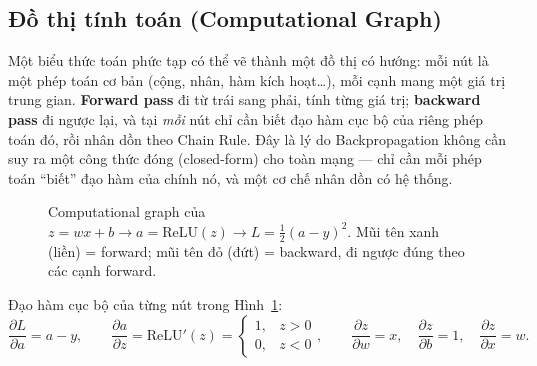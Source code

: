 \documentclass[12pt,a4paper]{article}
\begin{document}
\subsection{Đồ thị tính toán (Computational Graph)}
\label{sec:compgraph}

Một biểu thức toán phức tạp có thể vẽ thành một đồ thị có hướng: mỗi nút là
một phép toán cơ bản (cộng, nhân, hàm kích hoạt\ldots), mỗi cạnh mang một
giá trị trung gian. \textbf{Forward pass} đi từ trái sang phải, tính từng
giá trị; \textbf{backward pass} đi ngược lại, và tại \emph{mỗi} nút chỉ cần
biết đạo hàm cục bộ của riêng phép toán đó, rồi nhân dồn theo Chain Rule.
Đây là lý do Backpropagation không cần suy ra một công thức đóng
(closed-form) cho toàn mạng --- chỉ cần mỗi phép toán ``biết'' đạo hàm của
chính nó, và một cơ chế nhân dồn có hệ thống.

\begin{figure}[htbp]
\centering
{}
\caption{Computational graph của $z=wx+b \to a=\mathrm{ReLU}(z) \to L=\tfrac12(a-y)^2$.
Mũi tên xanh (liền) = forward; mũi tên đỏ (đứt) = backward, đi ngược đúng
theo các cạnh forward.}
\label{fig:compgraph}
\end{figure}

Đạo hàm cục bộ của từng nút trong Hình~\ref{fig:compgraph}:
$$\frac{\partial L}{\partial a}=a-y,\qquad
\frac{\partial a}{\partial z}=\mathrm{ReLU}'(z)=\begin{cases}1,& z>0\\0,& z< 0\end{cases},\qquad
\frac{\partial z}{\partial w}=x,\quad \frac{\partial z}{\partial b}=1,\quad \frac{\partial z}{\partial x}=w.$$
\end{document}
